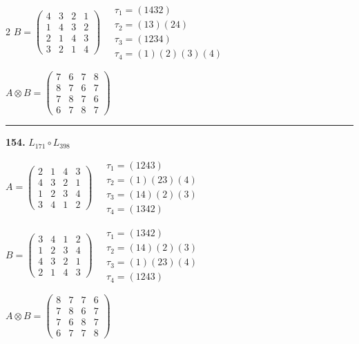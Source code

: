 \begin{multicols}{2}
$B = \begin{pmatrix} 4 & 3 & 2 & 1 \\ 1 & 4 & 3 & 2 \\ 2 & 1 & 4 & 3 \\ 3 & 2 & 1 & 4 \end{pmatrix} \quad \begin{matrix} \tau_{1}=(1 4 3 2) \\ \tau_{2}=(1 3)(2 4) \\ \tau_{3}=(1 2 3 4) \\ \tau_{4}=(1)(2)(3)(4) \end{matrix}$

$A \otimes B = \begin{pmatrix} 7 & 6 & 7 & 8 \\ 8 & 7 & 6 & 7 \\ 7 & 8 & 7 & 6 \\ 6 & 7 & 8 & 7 \end{pmatrix}$

\vspace{0.3em}
\hrule
\vspace{0.3em}

\noindent\textbf{154.} $L_{171} \circ L_{398}$

$A = \begin{pmatrix} 2 & 1 & 4 & 3 \\ 4 & 3 & 2 & 1 \\ 1 & 2 & 3 & 4 \\ 3 & 4 & 1 & 2 \end{pmatrix} \quad \begin{matrix} \tau_{1}=(1 2 4 3) \\ \tau_{2}=(1)(2 3)(4) \\ \tau_{3}=(1 4)(2)(3) \\ \tau_{4}=(1 3 4 2) \end{matrix}$

$B = \begin{pmatrix} 3 & 4 & 1 & 2 \\ 1 & 2 & 3 & 4 \\ 4 & 3 & 2 & 1 \\ 2 & 1 & 4 & 3 \end{pmatrix} \quad \begin{matrix} \tau_{1}=(1 3 4 2) \\ \tau_{2}=(1 4)(2)(3) \\ \tau_{3}=(1)(2 3)(4) \\ \tau_{4}=(1 2 4 3) \end{matrix}$

$A \otimes B = \begin{pmatrix} 8 & 7 & 7 & 6 \\ 7 & 8 & 6 & 7 \\ 7 & 6 & 8 & 7 \\ 6 & 7 & 7 & 8 \end{pmatrix}$


\end{multicols}
